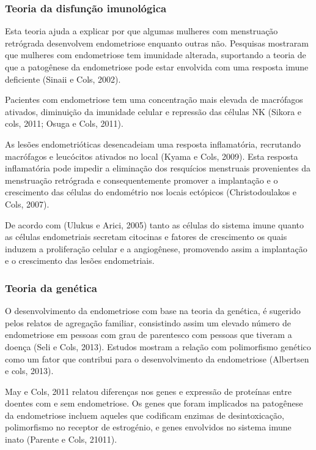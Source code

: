 \documentclass[12pt]{article} %
\begin{document}
\subsubsection{Teoria da disfunção imunológica}

Esta teoria ajuda a explicar por que algumas mulheres com menstruação
retrógrada desenvolvem endometriose enquanto outras não. Pesquisas
mostraram que mulheres com endometriose tem imunidade alterada,
suportando a teoria de que a patogênese da endometriose pode estar
envolvida com uma resposta imune deficiente (Sinaii e Cols, 2002).

Pacientes com endometriose tem uma concentração mais elevada de
macrófagos ativados, diminuição da imunidade celular e repressão das
células NK (Sikora e cols, 2011; Osuga e Cols, 2011).

As lesões endometrióticas desencadeiam uma resposta inflamatória,
recrutando macrófagos e leucócitos ativados no local (Kyama e Cols,
2009). Esta resposta inflamatória pode impedir a eliminação dos
resquícios menstruais provenientes da menstruação retrógrada e
consequentemente promover a implantação e o crescimento das células do
endométrio nos locais ectópicos (Christodoulakos e Cols, 2007).

De acordo com (Ulukus e Arici, 2005) tanto as células do sistema imune
quanto as células endometriais secretam citocinas e fatores de
crescimento os quais induzem a proliferação celular e a angiogênese,
promovendo assim a implantação e o crescimento das lesões
endometriais.

\subsubsection{Teoria da genética}

O desenvolvimento da endometriose com base na teoria da genética, é sugerido pelos relatos de agregação familiar, consistindo assim um elevado número de endometriose em pessoas com grau de parentesco com pessoas que tiveram a doença (Seli e Cols, 2013).
Estudos mostram a relação com polimorfismo genético como um fator que contribui para o desenvolvimento da endometriose (Albertsen e cols, 2013).

May e Cols, 2011 relatou  diferenças nos genes e expressão de proteínas entre doentes com e sem endometriose. Os genes que foram implicados na patogênese da endometriose incluem aqueles que codificam enzimas de desintoxicação, polimorfismo no receptor de estrogénio, e genes envolvidos no sistema imune inato (Parente e Cols, 21011). 
\end{document}
